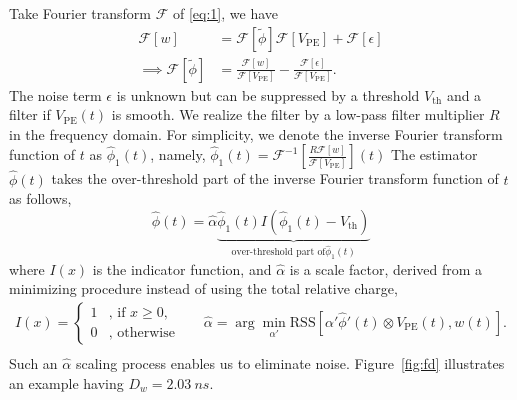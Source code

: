 Take Fourier transform $\mathcal{F}$ of \eqref{eq:1}, we have
\begin{equation}
  \label{eq:fourier}
  \begin{aligned}
  \mathcal{F}[w] & = \mathcal{F}[\tilde{\phi}]\mathcal{F}[V_\mathrm{PE}] + \mathcal{F}[\epsilon]\\
  \implies \mathcal{F}[\tilde{\phi}] & = \frac{\mathcal{F}[w]}{\mathcal{F}[V_\mathrm{PE}]} - \frac{\mathcal{F}[\epsilon]}{\mathcal{F}[V_\mathrm{PE}]}.
  \end{aligned}
\end{equation}
The noise term $\epsilon$ is unknown but can be suppressed by a threshold $V_\mathrm{th}$ and a filter if $V_\mathrm{PE}(t)$ is smooth. We realize the filter by a low-pass filter multiplier $R$ in the frequency domain. 
For simplicity, we denote the inverse Fourier transform function of $t$ as $\hat{\phi}_1(t)$, namely, $\hat{\phi}_1(t) = \mathcal{F}^{-1}\left[\frac{R \mathcal{F}[w]}{\mathcal{F}[V_\mathrm{PE}]}\right](t)$
The estimator $\hat{\phi}(t)$ takes the over-threshold part of the inverse Fourier transform function of $t$ as follows,
\begin{equation}
  \label{eq:fdconv2}
    \hat{\phi}(t) = \hat{\alpha}\underbrace{\hat{\phi}_1(t) I(\hat{\phi}_1(t) - V_\mathrm{th})}_{\text{over-threshold part of} \hat{\phi}_1(t)}  
\end{equation}
where $I(x)$ is the indicator function, and $\hat{\alpha}$ is a scale factor, derived from a minimizing procedure instead of using the total relative charge, 
\begin{equation}
  \begin{aligned}
  \label{eq:id}
  I(x) = \left\{
    \begin{array}{ll}
      1 & \mbox{, if $x\ge0$}, \\
      0 & \mbox{, otherwise}
    \end{array}
    \right.
    \quad~~~
    \hat{\alpha} = \arg \underset{\alpha'}{\min}\mathrm{RSS}\left[\alpha'\hat{\phi}'(t)\otimes V_\mathrm{PE}(t),w(t)\right]. \\
  \end{aligned}
\end{equation}
Such an $\hat{\alpha}$ scaling process enables us to eliminate noise. Figure~\ref{fig:fd} illustrates an example having $D_w = \SI{2.03}{ns}$. 

